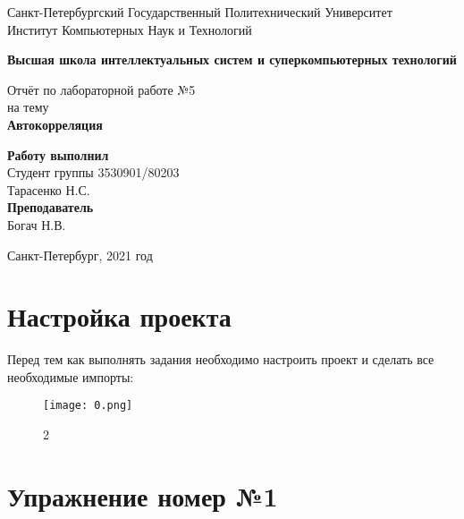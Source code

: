 \documentclass[10pt,a4paper,oneside]{article}
\begin{document}
\begin{titlepage}
\newpage
	\begin{center}
		\Large Санкт-Петербургский Государственный Политехнический Университет\\
		Институт Компьютерных Наук и Технологий\\
	\end{center}
	\begin{center}
		\large\textbf {Высшая школа интеллектуальных систем и суперкомпьютерных технологий}
	\end{center}
	
	\vspace{5em}
	\begin{center}
		\large{Отчёт по лабораторной работе №5 \\ на тему \\
		\textbf{Автокорреляция} }
	\end{center}
	
	\vspace{25em}
	\begin{flushright}
		\textbf{Работу выполнил\\}Студент группы 3530901/80203 \\ Тарасенко Н.С.\\
		\textbf{Преподаватель\\}Богач Н.В. 
	\end{flushright}
	
	\vspace{\fill}%
	\begin{center}
	Санкт-Петербург, 2021 год	
	\end{center}
\end{titlepage} %

\section{Настройка проекта}
Перед тем как выполнять задания необходимо настроить проект и сделать все необходимые импорты:

\begin{figure}[H]
        \centering
        \texttt{[image: 0.png]}
        \caption{2}
        \label{fig:first}
\end{figure}

\section{Упражнение номер №1}
\end{document}
